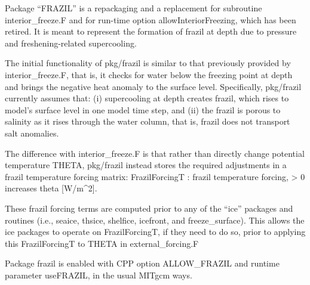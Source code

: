
Package ``FRAZIL'' is a repackaging and a replacement for subroutine
interior_freeze.F and for run-time option allowInteriorFreezing, which has
been retired.  It is meant to represent the formation of frazil at depth due
to pressure and freshening-related supercooling.

The initial functionality of pkg/frazil is similar to that previously provided
by interior_freeze.F, that is, it checks for water below the freezing point at
depth and brings the negative heat anomaly to the surface level.
Specifically, pkg/frazil currently assumes that: (i) supercooling at depth
creates frazil, which rises to model's surface level in one model time step,
and (ii) the frazil is porous to salinity as it rises through the water
column, that is, frazil does not transport salt anomalies.

The difference with interior_freeze.F is that rather than directly change
potential temperature THETA, pkg/frazil instead stores the required
adjustments in a frazil temperature forcing matrix:
FrazilForcingT : frazil temperature forcing, > 0 increases theta [W/m^2].

These frazil forcing terms are computed prior to any of the ``ice'' packages
and routines (i.e., seaice, thsice, shelfice, icefront, and freeze_surface).
This allows the ice packages to operate on FrazilForcingT, if they need to do
so, prior to applying this FrazilForcingT to THETA in external_forcing.F

Package frazil is enabled with CPP option ALLOW_FRAZIL and runtime parameter
useFRAZIL, in the usual MITgcm ways.
